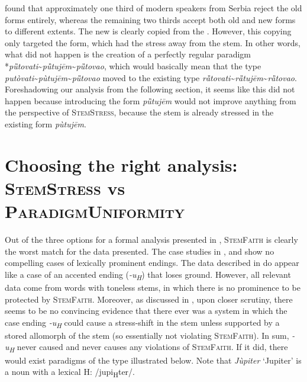 \documentclass[output=paper,nonflat,colorlinks,citecolor=brown,newtxmath]{langsci/langscibook}
\begin{document}
\newpage
\citet[]{Simonovic2015} found that approximately one third of modern speakers from Serbia reject the old forms entirely, whereas the remaining two thirds accept both old and new forms to different extents.
The new   is clearly copied from the . However, this copying only targeted the  form, which had the stress away from the stem. In other words, what did not happen is the creation of a perfectly regular paradigm *\textit{pȕtovati}\textasciitilde{}\textit{pȕtujēm}\textasciitilde{}\textit{pȕtovao}, which would basically mean that the type \textit{putòvati}\textasciitilde{}\textit{pùtujēm}\textasciitilde{}\textit{pȕtovao} moved to the existing type \textit{rȁtovati}\textasciitilde{}\textit{rȁtujēm}\textasciitilde{}\textit{rȁtovao}. Foreshadowing our analysis from the following section, it seems like this did not happen because introducing the form \textit{pȕtujēm} would not improve anything from the perspective of \textsc{StemStress}, because the stem is already stressed in the existing form \textit{pùtujēm}.

\section{Choosing the right analysis: \textsc{StemStress} vs \textsc{ParadigmUniformity}} \label{sec:kager:3}
Out of the three options for a formal analysis presented in , \textsc{StemFaith} is clearly the worst match for the data presented. The case studies in ,   and  show no compelling cases of lexically prominent endings. The data described in   do appear like a case of an accented ending (\textit{{-u}\textsubscript{H}}) that loses ground. However, all relevant data come from words with toneless stems, in which there is no  prominence to be protected by \textsc{StemFaith}. Moreover, as discussed in , upon closer scrutiny, there seems to be no convincing evidence that there ever was a system in which the case ending \textit{-u\textsubscript{H}} could cause a stress-shift in the stem unless supported by a stored allomorph of the stem (so essentially not violating \textsc{StemFaith}). In sum, \textit{-u\textsubscript{H}} never caused and never causes any violations of \textsc{StemFaith}. If it did, there would exist paradigms of the type illustrated below. Note that \textit{Jùpiter} `Jupiter' is a noun with a lexical H: /jupi\textsubscript{H}ter/.
\end{document}
